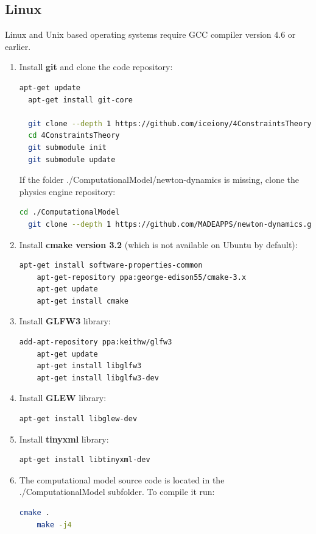 \documentclass[
    a4paper,
    man,
    floatsintext,
    british
]{apa6}
\begin{document}
\subsection{Linux}
Linux and Unix based operating systems require GCC compiler version 4.6 or earlier. 
\begin{enumerate}
  \item Install \textbf{git} and clone the code repository: 
    \begin{lstlisting}[language=bash]
  apt-get update
  apt-get install git-core

  git clone --depth 1 https://github.com/iceiony/4ConstraintsTheory.git 
  cd 4ConstraintsTheory
  git submodule init
  git submodule update
    \end{lstlisting}

    If the folder ./ComputationalModel/newton-dynamics is missing, clone the physics engine repository:
    \begin{lstlisting}[language=bash]
  cd ./ComputationalModel
  git clone --depth 1 https://github.com/MADEAPPS/newton-dynamics.git 
    \end{lstlisting}

  \item Install \textbf{cmake version 3.2} (which is not available on Ubuntu by default): 
    \begin{lstlisting}[language=bash]
    apt-get install software-properties-common
    apt-get-repository ppa:george-edison55/cmake-3.x
    apt-get update
    apt-get install cmake
    \end{lstlisting}

  \item Install \textbf{GLFW3} library:
    \begin{lstlisting}[language=bash]
    add-apt-repository ppa:keithw/glfw3
    apt-get update
    apt-get install libglfw3
    apt-get install libglfw3-dev
    \end{lstlisting}

  \item Install \textbf{GLEW} library:
    \begin{lstlisting}[language=bash]
    apt-get install libglew-dev
    \end{lstlisting}
    

  \item Install \textbf{tinyxml} library:
    \begin{lstlisting}[language=bash]
    apt-get install libtinyxml-dev
    \end{lstlisting}
    
  \item The computational model source code is located in the ./ComputationalModel subfolder. To compile it run:
    \begin{lstlisting}[language=bash]
    cmake .
    make -j4
    \end{lstlisting}
\end{enumerate}
\end{document}
